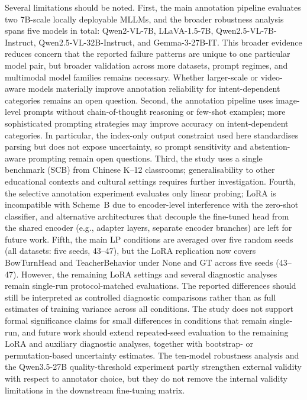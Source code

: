 \documentclass{ieeeaccess}
\begin{document}
Several limitations should be noted.
First, the main annotation pipeline evaluates two 7B-scale locally
deployable MLLMs, and the broader robustness analysis spans five
models in total: Qwen2-VL-7B, LLaVA-1.5-7B,
Qwen2.5-VL-7B-Instruct, Qwen2.5-VL-32B-Instruct, and Gemma-3-27B-IT.
This broader evidence reduces concern that the reported failure
patterns are unique to one particular model pair, but broader
validation across more datasets, prompt regimes, and multimodal model
families remains necessary.
Whether larger-scale or video-aware models materially improve
annotation reliability for intent-dependent categories remains an open
question.
Second, the annotation pipeline uses image-level prompts without
chain-of-thought reasoning or few-shot examples; more sophisticated
prompting strategies may improve accuracy on intent-dependent
categories. In particular, the index-only output constraint used here
standardises parsing but does not expose uncertainty, so prompt
sensitivity and abstention-aware prompting remain open questions.
Third, the study uses a single benchmark
(SCB) from Chinese K--12 classrooms; generalisability to other
educational contexts and cultural settings requires further
investigation.
Fourth, the selective annotation experiment evaluates only linear
probing; LoRA is incompatible with Scheme~B due to encoder-level
interference with the zero-shot classifier, and alternative
architectures that decouple the fine-tuned head from the shared
encoder (e.g., adapter layers, separate encoder branches) are left
for future work.
Fifth, the main LP conditions are averaged over five random seeds
(all datasets: five seeds, 43--47), but the
LoRA replication now covers BowTurnHead and TeacherBehavior under None
and GT across five seeds (43--47). However, the remaining LoRA
settings and several diagnostic analyses remain single-run
protocol-matched evaluations. The reported differences
should still be interpreted as controlled diagnostic
comparisons rather than as full estimates of training variance across
all conditions.
The study does not support formal significance claims for
small differences in conditions that remain single-run, and future
work should extend repeated-seed evaluation to the remaining LoRA and
auxiliary diagnostic analyses, together with bootstrap- or
permutation-based uncertainty estimates.
The ten-model robustness analysis and the Qwen3.5-27B quality-threshold
experiment partly strengthen external validity with respect to annotator
choice, but they do not remove the internal validity limitations in the
downstream fine-tuning matrix.
\end{document}
